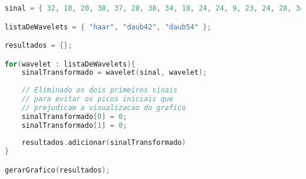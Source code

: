 \begin{lstlisting}[language=C++, caption={Algoritmo do experimento 4}, label={lst:experiment04Algo}]
sinal = { 32, 10, 20, 38, 37, 28, 38, 34, 18, 24, 24, 9, 23, 24, 28, 34, 32, 10, 20, 38, 37, 28, 38, 34, 18, 24, 24, 9, 23,...};

listaDeWavelets = { "haar", "daub42", "daub54" };

resultados = {};

for(wavelet : listaDeWavelets){
	sinalTransformado = wavelet(sinal, wavelet);
	
	// Eliminado os dois primeiros sinais 
	// para evitar os picos iniciais que
	// prejudicam a visualizacao do grafico
	sinalTransformado[0] = 0;
	sinalTransformado[1] = 0;
	
	resultados.adicionar(sinalTransformado)
}

gerarGrafico(resultados);
\end{lstlisting}
